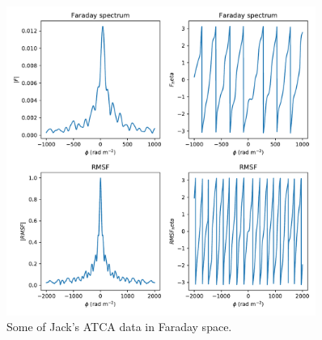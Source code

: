 \documentclass[a4paper]{article}
\begin{document}
        \begin{figure}
            \centering
            \includegraphics[width=0.9\textwidth]{dae/jack-example-faraday.pdf}
            \caption{\label{fig:jack-faraday} Some of Jack's ATCA data in Faraday space.}
        \end{figure}



\end{document}
